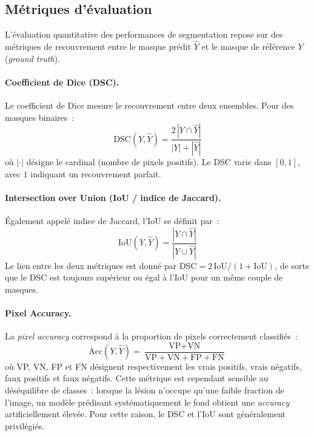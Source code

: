 \documentclass[12pt,a4paper]{article}
\begin{document}
\subsection{Métriques d'évaluation}
\label{subsec:metriques}

L'évaluation quantitative des performances de segmentation repose sur des métriques de recouvrement entre le masque prédit $\hat{Y}$ et le masque de référence $Y$ (\emph{ground truth}).

\paragraph{Coefficient de Dice (DSC).} Le coefficient de Dice \citep{dice1945measures} mesure le recouvrement entre deux ensembles. Pour des masques binaires~:
\begin{equation}
    \text{DSC}(Y, \hat{Y}) = \frac{2 \, |Y \cap \hat{Y}|}{|Y| + |\hat{Y}|}
    \label{eq:dice}
\end{equation}
où $|\cdot|$ désigne le cardinal (nombre de pixels positifs). Le DSC varie dans $[0, 1]$, avec $1$ indiquant un recouvrement parfait.

\paragraph{Intersection over Union (IoU / indice de Jaccard).} Également appelé indice de Jaccard, l'IoU se définit par~:
\begin{equation}
    \text{IoU}(Y, \hat{Y}) = \frac{|Y \cap \hat{Y}|}{|Y \cup \hat{Y}|}
    \label{eq:iou}
\end{equation}
Le lien entre les deux métriques est donné par $\text{DSC} = 2\,\text{IoU} / (1 + \text{IoU})$, de sorte que le DSC est toujours supérieur ou égal à l'IoU pour un même couple de masques.

\paragraph{Pixel Accuracy.} La \emph{pixel accuracy} correspond à la proportion de pixels correctement classifiés~:
\begin{equation}
    \text{Acc}(Y, \hat{Y}) = \frac{\text{VP} + \text{VN}}{\text{VP} + \text{VN} + \text{FP} + \text{FN}}
    \label{eq:accuracy}
\end{equation}
où VP, VN, FP et FN désignent respectivement les vrais positifs, vrais négatifs, faux positifs et faux négatifs. Cette métrique est cependant sensible au déséquilibre de classes~: lorsque la lésion n'occupe qu'une faible fraction de l'image, un modèle prédisant systématiquement le fond obtient une \emph{accuracy} artificiellement élevée. Pour cette raison, le DSC et l'IoU sont généralement privilégiés.
\end{document}
